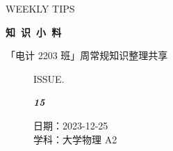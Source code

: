 \documentclass[UTF8]{ctexart}
\newcommand\Black[1]{\textcolor[gray]{0.3}{#1}}
\newcommand\Brown[1]{\textcolor[HTML]{998A4E}{#1}}
\newcommand\IssueNumber{15}
\newcommand\Date{2023-12-25}
\newcommand\Subject{大学物理 A2}
\begin{document}
\BgThispage
\begin{center}
{\scriptsize\Issue \textcolor[HTML]{C8BA83}{WEEKLY TIPS}}

{\Huge\bfseries\TitleFont \Black{知\ 识\ 小\ 料}}

\vspace{-0.1cm}
{\footnotesize \Brown{「电计 2203 班」周常规知识整理共享}}
\end{center}

\vspace{-0.5cm}

\begin{figure}[H]
\hspace{1cm}
\begin{minipage}[t]{0.3\textwidth}
\centering
    \Brown{ISSUE.}

    \vspace{-0.6cm}
    \Huge \Issue\slshape\bfseries\Black{\IssueNumber}
\end{minipage}
\hfill
\begin{minipage}[t]{0.35\textwidth}
\centering
    \Brown{日期：\Date} \\
\vspace{-0.1cm}
    \Brown{学科：\Subject} \\
\end{minipage}
\hspace{0.8cm}
\end{figure}
\end{document}
